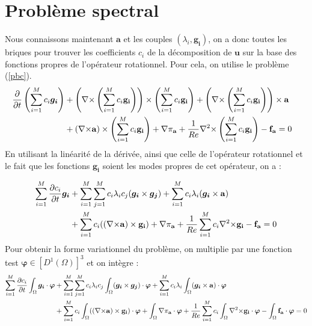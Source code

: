 \section{Problème spectral}
\label{spectre}
Nous connaissons maintenant $\bm{a}$ et les couples $(\lambda_i,\bm{g_i})$, on a donc toutes les briques pour trouver les coefficients $c_i$ de la décomposition de $\bm{u}$ sur la base des fonctions propres de l'opérateur rotationnel. Pour cela, on utilise le problème (\ref{pbc}).
\begin{align*}
\frac{\partial}{\partial t}\left(\sum_{i=1}^M c_i\bm{g_i}\right) &+ \left({\nabla\times} \left(\sum_{i=1}^Mc_i\mathbf{g_i}\right)\right)\times \left(\sum_{i=1}^Mc_i\mathbf{g_i}\right) + \left({\nabla\times} \left(\sum_{i=1}^Mc_i\mathbf{g_i}\right)\right)\times \mathbf{a}&\\
&+ ({\nabla\times} \mathbf{a})\times \left(\sum_{i=1}^Mc_i\mathbf{g_i}\right) + {\nabla} \pi_{\mathbf{a}} +\frac{1}{Re}{\nabla^2\times}  \left(\sum_{i=1}^Mc_i\mathbf{g_i}\right) - \mathbf{f_a} =0\\
\end{align*}
En utilisant la linéarité de la dérivée, ainsi que celle de l'opérateur rotationnel et le fait que les fonctions $\bm{g_i}$ soient les modes propres de cet opérateur, on a :


\begin{align*}
\sum_{i=1}^M\frac{\partial c_i}{\partial t}\bm{g_i} &+ \sum_{i=1}^M\sum_{j=1}^Mc_i\lambda_ic_j(\bm{g_i}\times \bm{g_j}) + \sum_{i=1}^Mc_i\lambda_i(\bm{g_i}\times \mathbf{a})\\
& +  \sum_{i=1}^Mc_i(({\nabla\times}\mathbf{a})\times \mathbf{g_i}) + {\nabla} \pi_{\mathbf{a}} +\frac{1}{Re}\sum_{i=1}^Mc_i{\nabla^2\times}\mathbf{g_i} - \mathbf{f_a} = 0\\
\end{align*}
Pour obtenir la forme variationnel du problème, on multiplie par une fonction test $\bm{\varphi}\in [D^1(\Omega)]^3$ et on intègre :
\begin{align*}
\sum_{i=1}^M\frac{\partial c_i}{\partial t}\int_\Omega\bm{g_i}\cdot\bm{\varphi} &+ \sum_{i=1}^M\sum_{j=1}^Mc_i\lambda_ic_j\int_\Omega(\bm{g_i}\times \bm{g_j})\cdot\bm{\varphi} + \sum_{i=1}^Mc_i\lambda_i\int_\Omega(\bm{g_i}\times \mathbf{a})\cdot\bm{\varphi}\\
& +  \sum_{i=1}^Mc_i\int_\Omega(({\nabla\times}\mathbf{a})\times \mathbf{g_i})\cdot\bm{\varphi} + \int_\Omega{\nabla} \pi_{\mathbf{a}}\cdot\bm{\varphi} +\frac{1}{Re}\sum_{i=1}^Mc_i\int_\Omega{\nabla^2\times}\mathbf{g_i}\cdot\bm{\varphi} - \int_\Omega\mathbf{f_a}\cdot\bm{\varphi} = 0\\
\end{align*}

